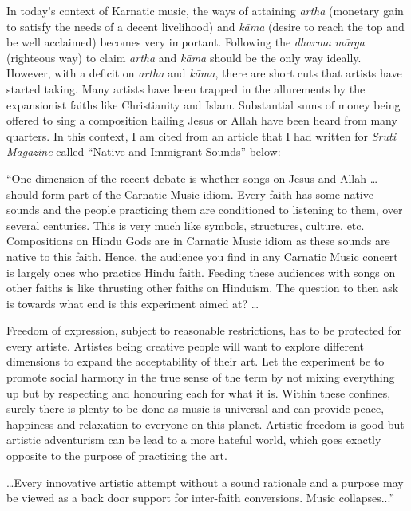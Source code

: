 In today’s context of Karnatic music, the ways of attaining \textit{artha} (monetary gain to satisfy the needs of a decent livelihood) and \textit{kāma} (desire to reach the top and be well acclaimed) becomes very important. Following the \textit{dharma} \textit{mārga} (righteous way) to claim \textit{artha} and \textit{kāma} should be the only way ideally. However, with a deficit on \textit{artha} and \textit{kāma}, there are short cuts that artists have started taking. Many artists have been trapped in the allurements by the expansionist faiths like Christianity and Islam. Substantial sums of money being offered to sing a composition hailing Jesus or Allah have been heard from many quarters. In this context, I am cited from an article that I had written for \textit{Sruti Magazine} called “Native and Immigrant Sounds” below:

\begin{myquote}
“One dimension of the recent debate is whether songs on Jesus and Allah … should form part of the Carnatic Music idiom. Every faith has some native sounds and the people practicing them are conditioned to listening to them, over several centuries. This is very much like symbols, structures, culture, etc. Compositions on Hindu Gods are in Carnatic Music idiom as these sounds are native to this faith. Hence, the audience you find in any Carnatic Music concert is largely ones who practice Hindu faith. Feeding these audiences with songs on other faiths is like thrusting other faiths on Hinduism. The question to then ask is towards what end is this experiment aimed at? …
\end{myquote}

\begin{myquote}
Freedom of expression, subject to reasonable restrictions, has to be protected for every artiste. Artistes being creative people will want to explore different dimensions to expand the acceptability of their art. Let the experiment be to promote social harmony in the true sense of the term by not mixing everything up but by respecting and honouring each for what it is. Within these confines, surely there is plenty to be done as music is universal and can provide peace, happiness and relaxation to everyone on this planet. Artistic freedom is good but artistic adventurism can be lead to a more hateful world, which goes exactly opposite to the purpose of practicing the art.
\end{myquote}

\begin{myquote}
…Every innovative artistic attempt without a sound rationale and a purpose may be viewed as a back door support for inter-faith conversions. Music collapses...”
\end{myquote}

